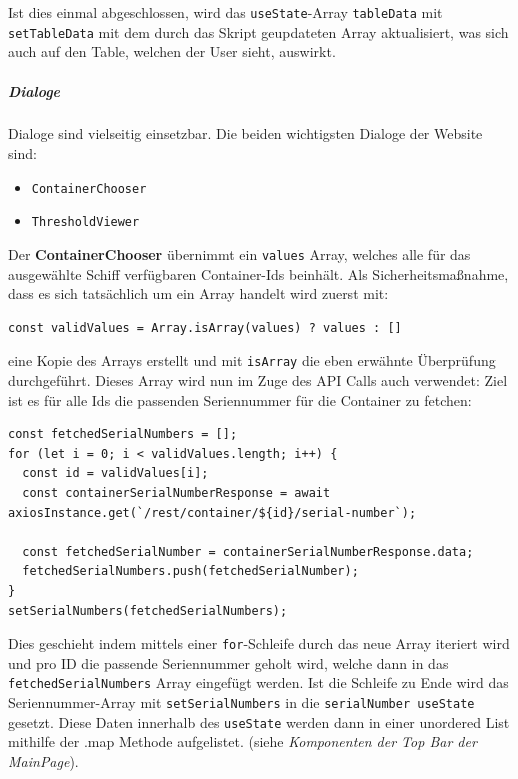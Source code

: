 \documentclass[
    headings=optiontotocandhead,%
    twoside,
    numbers=noenddot,%
    12pt, %
    titlepage, %
    parskip=full, %
    listof=leveldown, 
    numbers=noenddot, %
    a4paper,DIV=14,
    BCOR=15mm,
]{scrbook}
\newcommand{\passthrough}[1]{#1}
\providecommand{\tightlist}{%
  \setlength{\itemsep}{0pt}\setlength{\parskip}{0pt}}
\begin{document}
Ist dies einmal abgeschlossen, wird das
\passthrough{\lstinline!useState!}-Array
\passthrough{\lstinline!tableData!} mit
\passthrough{\lstinline!setTableData!} mit dem durch das Skript
geupdateten Array aktualisiert, was sich auch auf den Table, welchen der
User sieht, auswirkt.

\hypertarget{dialoge}{%
\subparagraph{Dialoge}\label{dialoge}}

Dialoge sind vielseitig einsetzbar. Die beiden wichtigsten Dialoge der
Website sind:

\begin{itemize}
\tightlist
\item
  \passthrough{\lstinline!ContainerChooser!}
\item
  \passthrough{\lstinline!ThresholdViewer!}
\end{itemize}

Der \textbf{ContainerChooser} übernimmt ein
\passthrough{\lstinline!values!} Array, welches alle für das ausgewählte
Schiff verfügbaren Container-Ids beinhält. Als Sicherheitsmaßnahme, dass
es sich tatsächlich um ein Array handelt wird zuerst mit:

\begin{lstlisting}[caption={Überprüfung ob eine Variable tatsächlich ein Array ist}]
const validValues = Array.isArray(values) ? values : []
\end{lstlisting}

eine Kopie des Arrays erstellt und mit \passthrough{\lstinline!isArray!}
die eben erwähnte Überprüfung durchgeführt. Dieses Array wird nun im
Zuge des API Calls auch verwendet: Ziel ist es für alle Ids die
passenden Seriennummer für die Container zu fetchen:

\begin{lstlisting}[caption={Fetchen und speichern der Serien Nummern der Container}]
const fetchedSerialNumbers = [];
for (let i = 0; i < validValues.length; i++) {
  const id = validValues[i];
  const containerSerialNumberResponse = await axiosInstance.get(`/rest/container/${id}/serial-number`);
  
  const fetchedSerialNumber = containerSerialNumberResponse.data;
  fetchedSerialNumbers.push(fetchedSerialNumber);
}
setSerialNumbers(fetchedSerialNumbers);
\end{lstlisting}

Dies geschieht indem mittels einer
\passthrough{\lstinline!for!}-Schleife durch das neue Array iteriert
wird und pro ID die passende Seriennummer geholt wird, welche dann in
das \passthrough{\lstinline!fetchedSerialNumbers!} Array eingefügt
werden. Ist die Schleife zu Ende wird das Seriennummer-Array mit
\passthrough{\lstinline!setSerialNumbers!} in die
\passthrough{\lstinline!serialNumber useState!} gesetzt. Diese Daten
innerhalb des \passthrough{\lstinline!useState!} werden dann in einer
unordered List mithilfe der .map Methode aufgelistet. (siehe
\emph{Komponenten der Top Bar der MainPage}).
\end{document}
